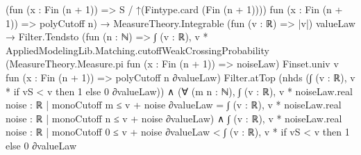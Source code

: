 \documentclass[10pt]{article}
\begin{document}
\begin{ReviewVerbatim}
                              (fun (x : Fin (n + 1)) => S / ↑(Fintype.card (Fin (n + 1)))) fun (x : Fin (n + 1)) =>
                              polyCutoff n) →
                          MeasureTheory.Integrable (fun (v : ℝ) => |v|) valueLaw →
                            Filter.Tendsto
                                (fun (n : ℕ) =>
                                  ∫ (v : ℝ),
                                    v *
                                      AppliedModelingLib.Matching.cutoffWeakCrossingProbability
                                        (MeasureTheory.Measure.pi fun (x : Fin (n + 1)) => noiseLaw) Finset.univ v
                                        fun (x : Fin (n + 1)) => polyCutoff n ∂valueLaw)
                                Filter.atTop (nhds (∫ (v : ℝ), v * if vS < v then 1 else 0 ∂valueLaw)) ∧
                              (∀ (m n : ℕ),
                                  ∫ (v : ℝ), v * noiseLaw.real {noise : ℝ | monoCutoff m ≤ v + noise} ∂valueLaw =
                                    ∫ (v : ℝ), v * noiseLaw.real {noise : ℝ | monoCutoff n ≤ v + noise} ∂valueLaw) ∧
                                ∫ (v : ℝ), v * noiseLaw.real {noise : ℝ | monoCutoff 0 ≤ v + noise} ∂valueLaw <
                                  ∫ (v : ℝ), v * if vS < v then 1 else 0 ∂valueLaw
\end{ReviewVerbatim}
\end{document}
